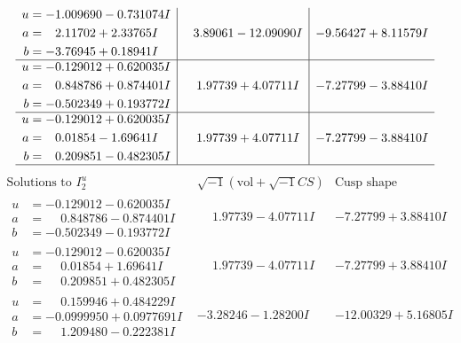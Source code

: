 \documentclass[1p]{elsarticle_modified}
\theoremstyle{definition}
\newcommand{\I}{\sqrt{-1}}
\begin{document}
$$\begin{array}{c|c|c}
\begin{aligned}
u &= -1.009690 - 0.731074 I \\
a &= \phantom{-}2.11702 + 2.33765 I \\
b &= -3.76945 + 0.18941 I\end{aligned}
 & \phantom{-}3.89061 - 12.09090 I & -9.56427 + 8.11579 I \\ \hline\begin{aligned}
u &= -0.129012 + 0.620035 I \\
a &= \phantom{-}0.848786 + 0.874401 I \\
b &= -0.502349 + 0.193772 I\end{aligned}
 & \phantom{-}1.97739 + 4.07711 I & -7.27799 - 3.88410 I \\ \hline\begin{aligned}
u &= -0.129012 + 0.620035 I \\
a &= \phantom{-}0.01854 - 1.69641 I \\
b &= \phantom{-}0.209851 - 0.482305 I\end{aligned}
 & \phantom{-}1.97739 + 4.07711 I & -7.27799 - 3.88410 I\\
 \hline 
 \end{array}$$\newpage$$\begin{array}{c|c|c}  
\text{Solutions to }I^u_{2}& \I (\text{vol} + \sqrt{-1}CS) & \text{Cusp shape}\\
 \hline 
\begin{aligned}
u &= -0.129012 - 0.620035 I \\
a &= \phantom{-}0.848786 - 0.874401 I \\
b &= -0.502349 - 0.193772 I\end{aligned}
 & \phantom{-}1.97739 - 4.07711 I & -7.27799 + 3.88410 I \\ \hline\begin{aligned}
u &= -0.129012 - 0.620035 I \\
a &= \phantom{-}0.01854 + 1.69641 I \\
b &= \phantom{-}0.209851 + 0.482305 I\end{aligned}
 & \phantom{-}1.97739 - 4.07711 I & -7.27799 + 3.88410 I \\ \hline\begin{aligned}
u &= \phantom{-}0.159946 + 0.484229 I \\
a &= -0.0999950 + 0.0977691 I \\
b &= \phantom{-}1.209480 - 0.222381 I\end{aligned}
 & -3.28246 - 1.28200 I & -12.00329 + 5.16805 I \\ \hline\begin{aligned}

\end{aligned}
\end{array}$$
\end{document}
